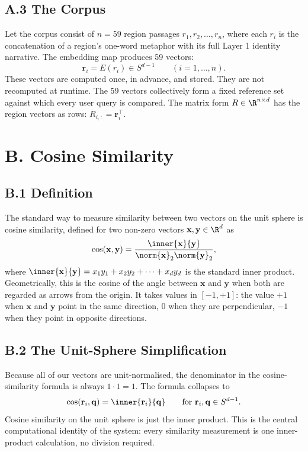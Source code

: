 \documentclass[11pt]{article}
\begin{document}
\subsection*{A.3 The Corpus}
Let the corpus consist of $n = 59$ region passages $r_1, r_2, \ldots, r_n$, where each $r_i$ is the concatenation of a region's one-word metaphor with its full Layer 1 identity narrative. The embedding map produces 59 vectors:
\[
\mathbf{r}_i = E(r_i) \in S^{d-1} \qquad (i = 1, \ldots, n).
\]
These vectors are computed once, in advance, and stored. They are not recomputed at runtime. The 59 vectors collectively form a fixed reference set against which every user query is compared. The matrix form $R \in \R^{n \times d}$ has the region vectors as rows: $R_{i,:} = \mathbf{r}_i^\top$.

\section*{B. Cosine Similarity}

\subsection*{B.1 Definition}
The standard way to measure similarity between two vectors on the unit sphere is cosine similarity, defined for two non-zero vectors $\mathbf{x}, \mathbf{y} \in \R^d$ as
\[
\cos(\mathbf{x}, \mathbf{y}) = \frac{\inner{\mathbf{x}}{\mathbf{y}}}{\norm{\mathbf{x}}_2 \norm{\mathbf{y}}_2},
\]
where $\inner{\mathbf{x}}{\mathbf{y}} = x_1 y_1 + x_2 y_2 + \cdots + x_d y_d$ is the standard inner product. Geometrically, this is the cosine of the angle between $\mathbf{x}$ and $\mathbf{y}$ when both are regarded as arrows from the origin. It takes values in $[-1, +1]$: the value $+1$ when $\mathbf{x}$ and $\mathbf{y}$ point in the same direction, $0$ when they are perpendicular, $-1$ when they point in opposite directions.

\subsection*{B.2 The Unit-Sphere Simplification}
Because all of our vectors are unit-normalised, the denominator in the cosine-similarity formula is always $1 \cdot 1 = 1$. The formula collapses to
\[
\cos(\mathbf{r}_i, \mathbf{q}) = \inner{\mathbf{r}_i}{\mathbf{q}} \qquad \text{for } \mathbf{r}_i, \mathbf{q} \in S^{d-1}.
\]
Cosine similarity on the unit sphere is just the inner product. This is the central computational identity of the system: every similarity measurement is one inner-product calculation, no division required.
\end{document}
